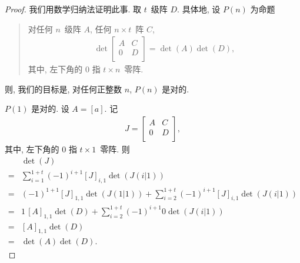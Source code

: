\documentclass[../libro.tex]{subfiles}
\begin{document}
\begin{proof}
    我们用数学归纳法证明此事.
    取 \(t\)~级阵 \(D\).
    具体地, 设 \(P(n)\) 为命题
    \begin{quotation}
        对任何 \(n\)~级阵 \(A\), 任何 \(n \times t\)~阵 \(C\),
        \begin{align*}
            \det {
                \begin{bmatrix}
                    A & C \\
                    0 & D \\
                \end{bmatrix}
            }
            = \det {(A)} \det {(D)},
        \end{align*}
        其中, 左下角的 \(0\) 指 \(t \times n\)~零阵.
    \end{quotation}
    则, 我们的目标是,
    对任何正整数 \(n\), \(P(n)\) 是对的.

    \(P(1)\) 是对的.
    设 \(A = [a]\).
    记
    \begin{align*}
        J =
        \begin{bmatrix}
            A & C \\
            0 & D \\
        \end{bmatrix},
    \end{align*}
    其中, 左下角的 \(0\) 指 \(t \times 1\)~零阵.
    则
    \begin{align*}
        & \det {(J)}
        \\
        = {} & \sum_{i = 1}^{1+t}
        {(-1)^{i+1} [J]_{i,1} \det {(J(i|1))}}
        \\
        = {} & (-1)^{1+1} [J]_{1,1} \det {(J(1|1))}
        + \sum_{i = 2}^{1+t}
        {(-1)^{i+1} [J]_{i,1} \det {(J(i|1))}}
        \\
        = {} & 1\, [A]_{1,1} \det {(D)}
        + \sum_{i = 2}^{1+t}
        {(-1)^{i+1} 0 \det {(J(i|1))}}
        \\
        = {} & [A]_{1,1} \det {(D)}
        \\
        = {} & \det {(A)} \det {(D)}.
    \end{align*}


\end{proof}
\end{document}
